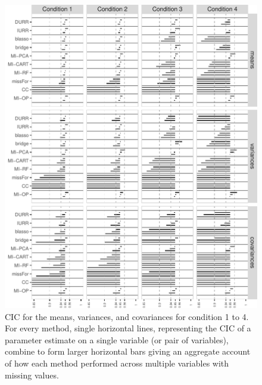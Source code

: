 \begin{figure}
	\includegraphics{../../output/graphs/exp2_semR_ci_14_summy.pdf}
\caption{CIC for the means, variances, and covariances for condition 1 to 4.
	For every method, single horizontal lines, representing the CIC of a parameter estimate on 
	a single variable (or pair of variables), combine to form larger horizontal bars giving an 
	aggregate account of how each method performed across multiple variables with missing values.
}
\label{fig:exp2cir14}
\end{figure}

